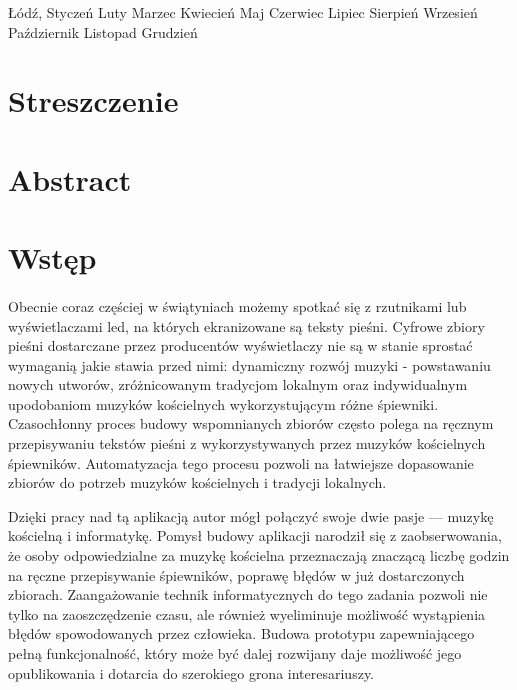 \documentclass[a4paper,12pt]{article}
\newcommand{\MONTH}{%
  \ifcase\the\month
  \or Styczeń %
  \or Luty %
  \or Marzec %
  \or Kwiecień %
  \or Maj %
  \or Czerwiec %
  \or Lipiec %
  \or Sierpień %
  \or Wrzesień %
  \or Październik %
  \or Listopad %
  \or Grudzień %
  \fi}
\begin{document}
        \vspace*{90px}

        \fontsize{12pt}{0.2}\selectfont 
            \begin{center}Łódź, \MONTH \vspace{2cm}  \the\year \end{center} 
    \endgroup
    \newpage
	\setcounter{page}{2}
    \tableofcontents
	\newpage 

	\section*{Streszczenie}
	\section*{Abstract}
    
	\newpage 

	\section{Wstęp}
			\paragraph{\indent} Obecnie coraz częściej w świątyniach możemy spotkać się z rzutnikami lub wyświetlaczami led, na których ekranizowane są teksty pieśni.
				Cyfrowe zbiory pieśni dostarczane przez producentów wyświetlaczy nie są w stanie sprostać wymaganią jakie stawia przed nimi: dynamiczny rozwój muzyki - powstawaniu nowych utworów, zróżnicowanym tradycjom lokalnym oraz indywidualnym upodobaniom muzyków kościelnych wykorzystującym różne śpiewniki.
				Czasochłonny proces budowy wspomnianych zbiorów często
				polega na ręcznym przepisywaniu tekstów pieśni z wykorzystywanych przez muzyków kościelnych śpiewników.
				Automatyzacja tego procesu pozwoli na łatwiejsze dopasowanie zbiorów do potrzeb muzyków kościelnych i tradycji lokalnych. 
				\par Dzięki pracy nad tą aplikacją autor mógł połączyć swoje dwie pasje --- muzykę kościelną i informatykę. Pomysł budowy aplikacji narodził się z zaobserwowania, że osoby odpowiedzialne za muzykę kościelna przeznaczają znaczącą liczbę godzin na ręczne przepisywanie śpiewników, poprawę błędów w już dostarczonych zbiorach. Zaangażowanie technik informatycznych do tego zadania pozwoli nie tylko na zaoszczędzenie czasu, ale również wyeliminuje możliwość wystąpienia błędów spowodowanych przez człowieka.
				Budowa prototypu zapewniającego pełną funkcjonalność, który może być dalej rozwijany daje możliwość jego opublikowania i dotarcia do szerokiego grona interesariuszy.  
\end{document}
